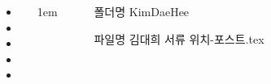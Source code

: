 \documentclass[20pt, a1paper ]{tikzposter}
\begin{document}
\begin{columns}
			{				
			\setlength{\leftmargini}{3em}			
			\setlength{\labelsep}{1em} %

			\begin{large}
			\begin{itemize}
			\item 
			\item 
			\item 
			\item 
			\item 

			\end{itemize}
			\end{large}
		}

			{
					\setlength{\leftmargini}{8em}
					\setlength{\labelsep} {1em}
				\begin{large}
					\begin{itemize}
					\item [폴더명] KimDaeHee
					\item [파일명] 김대희 서류 위치-포스트.tex 
					\end{itemize}
				\end{large}
			}


	\end{columns}
\end{document}
